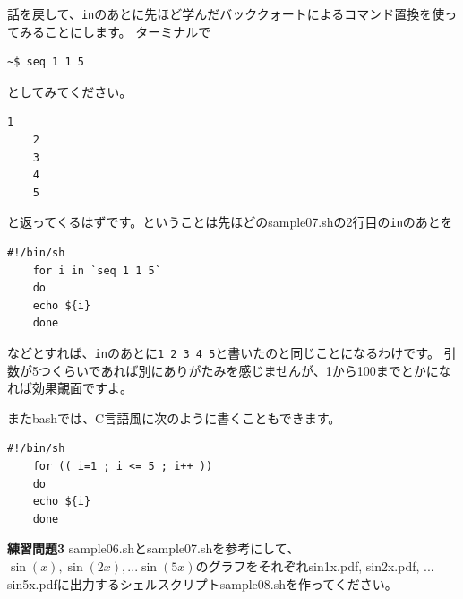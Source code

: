 \documentclass[a4j]{ltjsreport}
\begin{document}
    話を戻して、\texttt{in}のあとに先ほど学んだバッククォートによるコマンド置換を使ってみることにします。
    ターミナルで
    \begin{lstlisting}[numbers=none]
        ~$ seq 1 1 5
    \end{lstlisting}
    としてみてください。
    \begin{lstlisting}[numbers=none]
    1
    2
    3
    4
    5
    \end{lstlisting}
    と返ってくるはずです。ということは先ほどのsample07.shの2行目の\texttt{in}のあとを
    \begin{lstlisting}[caption=sample07.sh 改2]
    #!/bin/sh
    for i in `seq 1 1 5`
    do
    echo ${i}
    done
    \end{lstlisting}
    などとすれば、\texttt{in}のあとに\texttt{1 2 3 4 5}と書いたのと同じことになるわけです。
    引数が5つくらいであれば別にありがたみを感じませんが、1から100までとかになれば効果覿面ですよ。

    またbashでは、C言語風に次のように書くこともできます。
    \begin{lstlisting}[caption=sample07.sh 改3]
    #!/bin/sh
    for (( i=1 ; i <= 5 ; i++ ))
    do
    echo ${i}
    done
    \end{lstlisting}


    \begin{itembox}[l]{\textbf{練習問題3}}
        sample06.shとsample07.shを参考にして、$\sin(x), \sin(2x), ... \sin(5x)$のグラフをそれぞれsin1x.pdf, sin2x.pdf, ... sin5x.pdfに出力するシェルスクリプトsample08.shを作ってください。
    \end{itembox}
\end{document}
